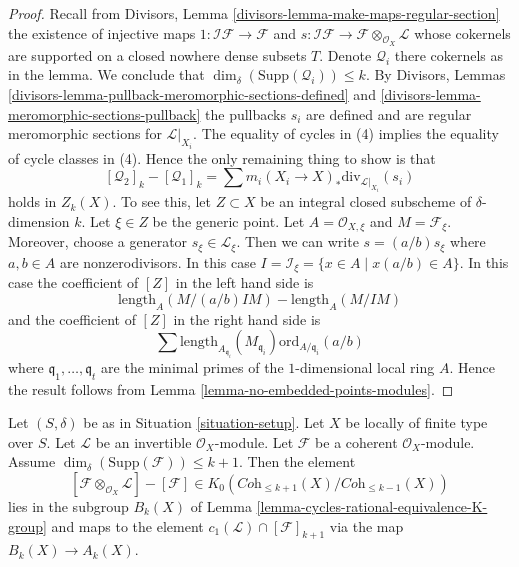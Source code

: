 \begin{proof}
Recall from Divisors, Lemma \ref{divisors-lemma-make-maps-regular-section}
the existence of injective maps
$1 : \mathcal{I}\mathcal{F} \to \mathcal{F}$ and
$s : \mathcal{I}\mathcal{F} \to \mathcal{F} \otimes_{\mathcal{O}_X}\mathcal{L}$
whose cokernels are supported on a closed nowhere dense subsets $T$.
Denote $\mathcal{Q}_i$ there cokernels as in the lemma.
We conclude that $\dim_\delta(\text{Supp}(\mathcal{Q}_i)) \leq k$.
By Divisors, Lemmas \ref{divisors-lemma-pullback-meromorphic-sections-defined}
and \ref{divisors-lemma-meromorphic-sections-pullback} the pullbacks $s_i$
are defined and are regular meromorphic sections for $\mathcal{L}|_{X_i}$.
The equality of cycles in (4) implies the equality of cycle classes
in (4). Hence the only remaining thing to show is that
$$
[\mathcal{Q}_2]_k - [\mathcal{Q}_1]_k
=
\sum m_i(X_i \to X)_*\text{div}_{\mathcal{L}|_{X_i}}(s_i)
$$
holds in $Z_k(X)$. To see this, let $Z \subset X$ be an integral closed
subscheme of $\delta$-dimension $k$. Let $\xi \in Z$ be the generic point.
Let $A = \mathcal{O}_{X, \xi}$ and $M = \mathcal{F}_\xi$.
Moreover, choose a generator $s_\xi \in \mathcal{L}_\xi$.
Then we can write $s = (a/b) s_\xi$ where $a, b \in A$ are
nonzerodivisors. In this case
$I = \mathcal{I}_\xi = \{x \in A \mid x(a/b) \in A\}$.
In this case the coefficient of $[Z]$ in the left hand side is
$$
\text{length}_A(M/(a/b)IM) - \text{length}_A(M/IM)
$$
and the coefficient of $[Z]$ in the right hand side
is
$$
\sum
\text{length}_{A_{\mathfrak q_i}}(M_{\mathfrak q_i})
\text{ord}_{A/\mathfrak q_i}(a/b)
$$
where $\mathfrak q_1, \ldots, \mathfrak q_t$ are the minimal
primes of the $1$-dimensional local ring $A$. Hence the result
follows from Lemma \ref{lemma-no-embedded-points-modules}.
\end{proof}

\begin{lemma}
\label{lemma-coherent-sheaf-cap-c1}
Let $(S, \delta)$ be as in Situation \ref{situation-setup}.
Let $X$ be locally of finite type over $S$.
Let $\mathcal{L}$ be an invertible $\mathcal{O}_X$-module.
Let $\mathcal{F}$ be a coherent $\mathcal{O}_X$-module.
Assume $\dim_\delta(\text{Supp}(\mathcal{F})) \leq k + 1$.
Then the element
$$
[\mathcal{F} \otimes_{\mathcal{O}_X} \mathcal{L}]
-
[\mathcal{F}]
\in
K_0(\textit{Coh}_{\leq k + 1}(X)/\textit{Coh}_{\leq k - 1}(X))
$$
lies in the subgroup $B_k(X)$ of
Lemma \ref{lemma-cycles-rational-equivalence-K-group} and maps to
the element $c_1(\mathcal{L}) \cap [\mathcal{F}]_{k + 1}$ via
the map $B_k(X) \to A_k(X)$.
\end{lemma}

